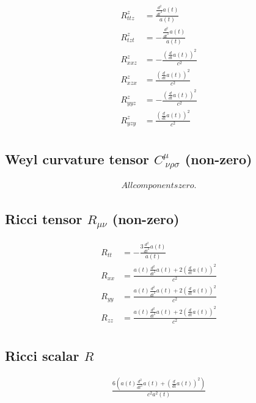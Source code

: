 \documentclass{article}
\begin{document}
\begin{align}
R^{z}_{t t z} &= \frac{\frac{d^{2}}{d t^{2}} a{\left(t \right)}}{a{\left(t \right)}} \\
R^{z}_{t z t} &= - \frac{\frac{d^{2}}{d t^{2}} a{\left(t \right)}}{a{\left(t \right)}} \\
R^{z}_{x x z} &= - \frac{\left(\frac{d}{d t} a{\left(t \right)}\right)^{2}}{c^{2}} \\
R^{z}_{x z x} &= \frac{\left(\frac{d}{d t} a{\left(t \right)}\right)^{2}}{c^{2}} \\
R^{z}_{y y z} &= - \frac{\left(\frac{d}{d t} a{\left(t \right)}\right)^{2}}{c^{2}} \\
R^{z}_{y z y} &= \frac{\left(\frac{d}{d t} a{\left(t \right)}\right)^{2}}{c^{2}} \\
\end{align}

\subsection{Weyl curvature tensor $C^{\mu}_{\ \nu\rho\sigma}$ (non-zero)}
\begin{align}
All components zero.
\end{align}

\subsection{Ricci tensor $R_{\mu\nu}$ (non-zero)}
\begin{align}
R_{tt} &= - \frac{3 \frac{d^{2}}{d t^{2}} a{\left(t \right)}}{a{\left(t \right)}} \\
R_{xx} &= \frac{a{\left(t \right)} \frac{d^{2}}{d t^{2}} a{\left(t \right)} + 2 \left(\frac{d}{d t} a{\left(t \right)}\right)^{2}}{c^{2}} \\
R_{yy} &= \frac{a{\left(t \right)} \frac{d^{2}}{d t^{2}} a{\left(t \right)} + 2 \left(\frac{d}{d t} a{\left(t \right)}\right)^{2}}{c^{2}} \\
R_{zz} &= \frac{a{\left(t \right)} \frac{d^{2}}{d t^{2}} a{\left(t \right)} + 2 \left(\frac{d}{d t} a{\left(t \right)}\right)^{2}}{c^{2}} \\
\end{align}

\subsection{Ricci scalar $R$}
\begin{align}
\frac{6 \left(a{\left(t \right)} \frac{d^{2}}{d t^{2}} a{\left(t \right)} + \left(\frac{d}{d t} a{\left(t \right)}\right)^{2}\right)}{c^{2} a^{2}{\left(t \right)}}
\end{align}
\end{document}
